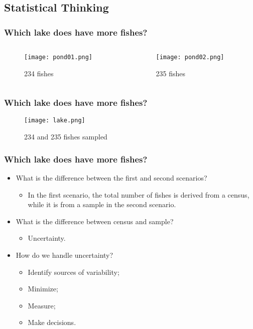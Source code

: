 \documentclass[10pt]{beamer}
\begin{document}
\subsection{Statistical Thinking}

\begin{frame}
\frametitle{Which lake does have more fishes?}
\begin{columns}
\begin{column}{0.45\textwidth}
\begin{figure}
	\centering
		\texttt{[image: pond01.png]}
	\caption{234 fishes}
	\label{fig:pond01}
\end{figure}
\end{column}
\begin{column}{0.45\textwidth}
\begin{figure}
	\centering
		\texttt{[image: pond02.png]}
	\caption{235 fishes}
	\label{fig:pond02}
\end{figure}
\end{column}
\end{columns}
\end{frame}


\begin{frame}
\frametitle{Which lake does have more fishes?}
\begin{figure}
	\centering
		\texttt{[image: lake.png]}
	\caption{234 and 235 fishes sampled}
	\label{fig:lake}
\end{figure}
\end{frame}


\begin{frame}
\frametitle{Which lake does have more fishes?}
\begin{itemize}
\item<1-> What is the difference between the first and second scenarios?
\begin{itemize}
\item<2-> In the first scenario, the total number of fishes is derived from a census, while it is from a sample in the second scenario.
\end{itemize}
\item<3-> What is the difference between census and sample?
\begin{itemize}
\item<4-> Uncertainty.
\end{itemize}
\item<5-> How do we handle uncertainty?
\begin{itemize}
\item<6-> Identify sources of variability;
\item<7-> Minimize;
\item<8-> Measure;
\item<9-> Make decisions.
\end{itemize}
\end{itemize}
\end{frame}
\end{document}
